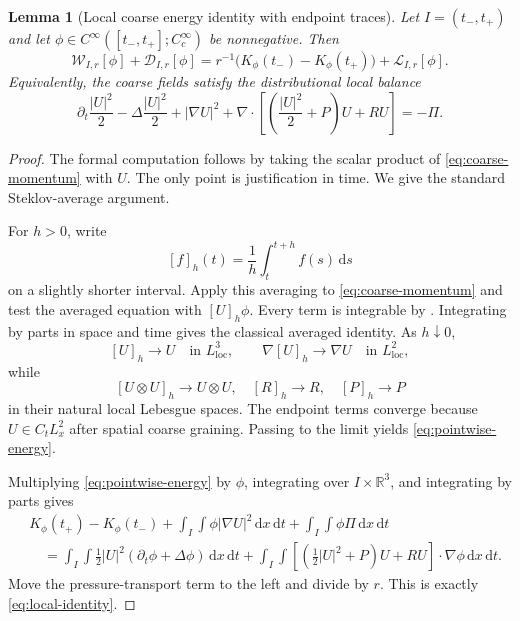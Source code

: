 \documentclass[10pt,a4paper]{amsart}
\numberwithin{equation}{section}
\newtheorem{lemma}[theorem]{Lemma}
\newcommand{\R}{\mathbb R}
\newcommand{\dd}{\,\mathrm d}
\newcommand{\dxdt}{\,\mathrm dx\,\mathrm dt}
\newcommand{\W}{\mathcal W}
\newcommand{\D}{\mathcal D}
\newcommand{\Lk}{\mathcal L}
\begin{document}
\begin{lemma}[Local coarse energy identity with endpoint traces]\label{lem:local-identity}
Let \(I=(t_-,t_+)\) and let \(\phi\in C^\infty([t_-,t_+];C_c^\infty)\) be nonnegative. Then
\begin{equation}\label{eq:local-identity}
\boxed{
\W_{I,r}[\phi]
+
\D_{I,r}[\phi]
=
r^{-1}\bigl(K_\phi(t_-)-K_\phi(t_+)\bigr)
+
\Lk_{I,r}[\phi].
}
\end{equation}
Equivalently, the coarse fields satisfy the distributional local balance
\begin{equation}\label{eq:pointwise-energy}
\partial_t\frac{|U|^2}{2}
-
\Delta\frac{|U|^2}{2}
+
|\nabla U|^2
+
\nabla\cdot
\left[
\left(\frac{|U|^2}{2}+P\right)U+RU
\right]
=-\Pi.
\end{equation}
\end{lemma}

\begin{proof}
The formal computation follows by taking the scalar product of \eqref{eq:coarse-momentum} with \(U\). The only point is justification in time. We give the standard Steklov-average argument.

For \(h>0\), write
\[
[f]_h(t)=\frac1h\int_t^{t+h}f(s)\dd s
\]
on a slightly shorter interval. Apply this averaging to \eqref{eq:coarse-momentum} and test the averaged equation with \([U]_h\phi\). Every term is integrable by . Integrating by parts in space and time gives the classical averaged identity. As \(h\downarrow0\),
\[
[U]_h\to U\quad\text{in }L^3_{\mathrm{loc}},
\qquad
\nabla[U]_h\to\nabla U\quad\text{in }L^2_{\mathrm{loc}},
\]
while
\[
[U\otimes U]_h\to U\otimes U,
\quad
[R]_h\to R,
\quad
[P]_h\to P
\]
in their natural local Lebesgue spaces. The endpoint terms converge because \(U\in C_tL^2_x\) after spatial coarse graining. Passing to the limit yields \eqref{eq:pointwise-energy}.

Multiplying \eqref{eq:pointwise-energy} by \(\phi\), integrating over \(I\times\R^3\), and integrating by parts gives
\begin{align*}
&K_\phi(t_+)-K_\phi(t_-)
+
\int_I\int\phi|\nabla U|^2\dxdt
+
\int_I\int\phi\Pi\dxdt
\\
&\quad=
\int_I\int
\frac12|U|^2(\partial_t\phi+\Delta\phi)\dxdt
+
\int_I\int
\left[
\left(\frac12|U|^2+P\right)U+RU
\right]\cdot\nabla\phi\dxdt.
\end{align*}
Move the pressure-transport term to the left and divide by \(r\). This is exactly \eqref{eq:local-identity}.
\end{proof}
\end{document}
